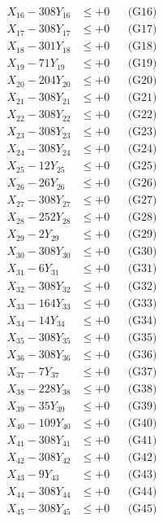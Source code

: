 \documentclass[a4paper,10pt]{article}
\begin{document}
{\begin{align}
X_{16} - 308Y_{16} &\leq +0 && \text{(G16)} \\
X_{17} - 308Y_{17} &\leq +0 && \text{(G17)} \\
X_{18} - 301Y_{18} &\leq +0 && \text{(G18)} \\
X_{19} - 71Y_{19} &\leq +0 && \text{(G19)} \\
X_{20} - 204Y_{20} &\leq +0 && \text{(G20)} \\
\allowbreak
X_{21} - 308Y_{21} &\leq +0 && \text{(G21)} \\
X_{22} - 308Y_{22} &\leq +0 && \text{(G22)} \\
X_{23} - 308Y_{23} &\leq +0 && \text{(G23)} \\
X_{24} - 308Y_{24} &\leq +0 && \text{(G24)} \\
X_{25} - 12Y_{25} &\leq +0 && \text{(G25)} \\
X_{26} - 26Y_{26} &\leq +0 && \text{(G26)} \\
X_{27} - 308Y_{27} &\leq +0 && \text{(G27)} \\
X_{28} - 252Y_{28} &\leq +0 && \text{(G28)} \\
X_{29} - 2Y_{29} &\leq +0 && \text{(G29)} \\
X_{30} - 308Y_{30} &\leq +0 && \text{(G30)} \\
\allowbreak
X_{31} - 6Y_{31} &\leq +0 && \text{(G31)} \\
X_{32} - 308Y_{32} &\leq +0 && \text{(G32)} \\
X_{33} - 164Y_{33} &\leq +0 && \text{(G33)} \\
X_{34} - 14Y_{34} &\leq +0 && \text{(G34)} \\
X_{35} - 308Y_{35} &\leq +0 && \text{(G35)} \\
X_{36} - 308Y_{36} &\leq +0 && \text{(G36)} \\
X_{37} - 7Y_{37} &\leq +0 && \text{(G37)} \\
X_{38} - 228Y_{38} &\leq +0 && \text{(G38)} \\
X_{39} - 35Y_{39} &\leq +0 && \text{(G39)} \\
X_{40} - 109Y_{40} &\leq +0 && \text{(G40)} \\
\allowbreak
X_{41} - 308Y_{41} &\leq +0 && \text{(G41)} \\
X_{42} - 308Y_{42} &\leq +0 && \text{(G42)} \\
X_{43} - 9Y_{43} &\leq +0 && \text{(G43)} \\
X_{44} - 308Y_{44} &\leq +0 && \text{(G44)} \\
X_{45} - 308Y_{45} &\leq +0 && \text{(G45)} \\

\end{align}}
\end{document}
